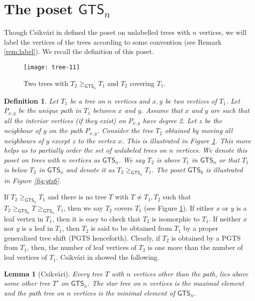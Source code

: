 \documentclass[12pt]{article}
\newtheorem{lemma}[theorem]{Lemma}
\newtheorem{definition}[theorem]{Definition}
\newcommand{\GTS}{\mathsf{GTS}}
\begin{document}
\section{The poset $\GTS_n$} 
\label{sec:gts_poset}
Though Csikv{\'a}ri in \cite{csikvari-poset1} defined the poset
on unlabelled trees with $n$ vertices, we will label
the vertices of the trees according to some convention (see Remark \ref{rem:label}).
We recall the definition of this poset.

\begin{figure}[h]
\centerline{\texttt{[image: tree-11]}}
\caption{Two trees with $T_2 \geq_{\GTS_n} T_1$ and $T_2$ covering $T_1$.}
\label{fig:gts_example}
\end{figure}

\begin{definition}
  Let $T_1$ be a tree on $n$ vertices and $x, y$ be two vertices of $T_1$.  Let $P_{x,y}$ be the
  unique path in $T_1$ between $x$ and $y$.  Assume that $x$ and $y$ are such that 
all the interior vertices (if they exist) on $P_{x,y}$ have degree 2.  
Let $z$ be the neighbour of $y$ on the path $P_{x,y}$.  Consider the tree $T_2$ obtained by 
moving all neighbours of $y$ except $z$ to the vertex $x$. 
This is illustrated in Figure \ref{fig:gts_example}.  This move helps us
to partially order the set of unlabeled trees on $n$ vertices.   We 
denote this poset on trees with $n$ vertices as $\GTS_n$.  
We say $T_2$ is above $T_1$ in $\GTS_n$ or that $T_1$ is below $T_2$ in $\GTS_n$
and denote it as $T_2 \geq_{\GTS_n} T_1$.
The poset $\GTS_6$ is illustrated in Figure \ref{fig:gts6}.
\end{definition}

If $T_2 \geq_{\GTS_n} T_1$ and there is no tree $T$ with $T \not= T_1, T_2$ 
such that $T_2 \geq_{\GTS_n} T \geq_{\GTS_n} T_1$, then we say $T_2$ covers
$T_1$ (see Figure \ref{fig:gts_example}).
If either $x$ or $y$ is a leaf vertex in $T_1$, then it is easy to check that $T_2$ is 
isomorphic to $T_1$.  If neither $x$ nor $y$ is a leaf in $T_1$, then $T_2$ 
is said to be obtained from $T_1$ by a proper generalized tree shift (PGTS henceforth).
Clearly, if $T_2$ is obtained by a PGTS from $T_1$, then, the number 
of leaf vertices of $T_2$ is one more than the number of leaf vertices of $T_1$. 
Csikv{\'a}ri in \cite{csikvari-poset1} showed the following.

\begin{lemma}[Csikv{\'a}ri]
  \label{lem:csikvari-prelim}
Every tree $T$ with $n$ vertices other than the path, lies above some 
other tree $T'$ on $\GTS_n$.  The star tree on $n$ vertices is the maximal element and
the path tree on $n$ vertices is the minimal element of $\GTS_n$.
\end{lemma}
\end{document}
